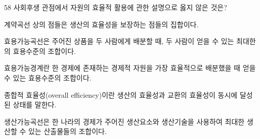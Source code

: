 \begin{question}{58}
사회후생 관점에서 자원의 효율적 활용에 관한 설명으로 옳지 않은 것은?
\begin{choices}
  \item 계약곡선 상의 점들은 생산의 효율성을 보장하는 점들의 집합이다.
  \item 효용가능곡선은 주어진 상품을 두 사람에게 배분할 때, 두 사람이 얻을 수 있는 최대한의 효용수준의 조합이다.
  \item 효용가능경계란 한 경제에 존재하는 경제적 자원을 가장 효율적으로 배분했을 때 얻을 수 있는 효용수준의 조합이다.
  \item 종합적 효율성(overall efficiency)이란 생산의 효율성과 교환의 효율성이 동시에 달성된 상태를 말한다.
  \item 생산가능곡선은 한 나라의 경제가 주어진 생산요소와 생산기술을 사용하여 최대한 생산할 수 있는 산출물들의 조합이다.
\end{choices}
\end{question}
